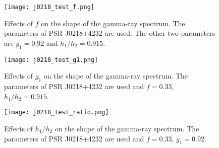 \documentclass[a4paper, 12pt]{report}
\begin{document}
  \begin{figure}[!htp]
    \centering 
    \texttt{[image: j0218\_test\_f.png]}
    \caption[Effects of $f$ on the shape of the gamma-ray spectrum.]
      {Effects of $f$ on the shape of the gamma-ray spectrum. The parameters of PSR 
      J0218+4232 are used. The other two parameters are $g_1=0.92$ and $h_1/h_2=0.915$. }
    \label{fig: j0218_test_f}
  \end{figure}

  \begin{figure}[!htp]
    \centering 
    \texttt{[image: j0218\_test\_g1.png]}
    \caption[Effects of $g_1$ on the shape of the gamma-ray spectrum.]
      {Effects of $g_1$ on the shape of the gamma-ray spectrum. The parameters of PSR 
      J0218+4232 are used and $f=0.33$, $h_1/h_2=0.915$.}
    \label{fig: j0218_test_g1}
  \end{figure}

  \begin{figure}[!htp]
    \centering 
    \texttt{[image: j0218\_test\_ratio.png]}
    \caption[Effects of $h_1/h_2$ on the shape of the gamma-ray spectrum.]
      {Effects of $h_1/h_2$ on the shape of the gamma-ray spectrum. The parameters of PSR 
      J0218+4232 are used and $f=0.33$, $g_1=0.92$.}
    \label{fig: j0218_test_ratio}
  \end{figure}

  \begin{table}[!htp]
    \centering 
      \caption[The best-fit parameters of the two-layer model and observational properties 
        for a few pulsars]
        {The best-fit parameters of the two-layer model and observational properties 
        for a few pulsars. Both young pulsars and MSPs are included. }
      \label{table: two_layer_other_parameters}
  \end{table}
\end{document}
